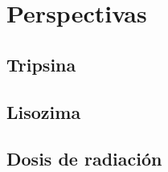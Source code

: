 \documentclass[11pt,letterpaper]{article}
\begin{document}
\section{Perspectivas}
 	
\subsection{Tripsina}

\subsection{Lisozima}
 	
\subsection{Dosis de radiación}
	 
	


\end{document}
